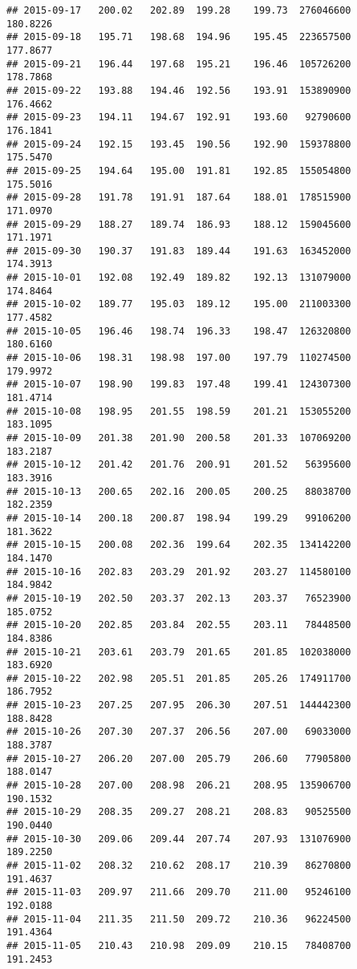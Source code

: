 \documentclass[
]{article}
\begin{document}
\begin{verbatim}
## 2015-09-17   200.02   202.89  199.28    199.73  276046600     180.8226
## 2015-09-18   195.71   198.68  194.96    195.45  223657500     177.8677
## 2015-09-21   196.44   197.68  195.21    196.46  105726200     178.7868
## 2015-09-22   193.88   194.46  192.56    193.91  153890900     176.4662
## 2015-09-23   194.11   194.67  192.91    193.60   92790600     176.1841
## 2015-09-24   192.15   193.45  190.56    192.90  159378800     175.5470
## 2015-09-25   194.64   195.00  191.81    192.85  155054800     175.5016
## 2015-09-28   191.78   191.91  187.64    188.01  178515900     171.0970
## 2015-09-29   188.27   189.74  186.93    188.12  159045600     171.1971
## 2015-09-30   190.37   191.83  189.44    191.63  163452000     174.3913
## 2015-10-01   192.08   192.49  189.82    192.13  131079000     174.8464
## 2015-10-02   189.77   195.03  189.12    195.00  211003300     177.4582
## 2015-10-05   196.46   198.74  196.33    198.47  126320800     180.6160
## 2015-10-06   198.31   198.98  197.00    197.79  110274500     179.9972
## 2015-10-07   198.90   199.83  197.48    199.41  124307300     181.4714
## 2015-10-08   198.95   201.55  198.59    201.21  153055200     183.1095
## 2015-10-09   201.38   201.90  200.58    201.33  107069200     183.2187
## 2015-10-12   201.42   201.76  200.91    201.52   56395600     183.3916
## 2015-10-13   200.65   202.16  200.05    200.25   88038700     182.2359
## 2015-10-14   200.18   200.87  198.94    199.29   99106200     181.3622
## 2015-10-15   200.08   202.36  199.64    202.35  134142200     184.1470
## 2015-10-16   202.83   203.29  201.92    203.27  114580100     184.9842
## 2015-10-19   202.50   203.37  202.13    203.37   76523900     185.0752
## 2015-10-20   202.85   203.84  202.55    203.11   78448500     184.8386
## 2015-10-21   203.61   203.79  201.65    201.85  102038000     183.6920
## 2015-10-22   202.98   205.51  201.85    205.26  174911700     186.7952
## 2015-10-23   207.25   207.95  206.30    207.51  144442300     188.8428
## 2015-10-26   207.30   207.37  206.56    207.00   69033000     188.3787
## 2015-10-27   206.20   207.00  205.79    206.60   77905800     188.0147
## 2015-10-28   207.00   208.98  206.21    208.95  135906700     190.1532
## 2015-10-29   208.35   209.27  208.21    208.83   90525500     190.0440
## 2015-10-30   209.06   209.44  207.74    207.93  131076900     189.2250
## 2015-11-02   208.32   210.62  208.17    210.39   86270800     191.4637
## 2015-11-03   209.97   211.66  209.70    211.00   95246100     192.0188
## 2015-11-04   211.35   211.50  209.72    210.36   96224500     191.4364
## 2015-11-05   210.43   210.98  209.09    210.15   78408700     191.2453

\end{verbatim}
\end{document}
